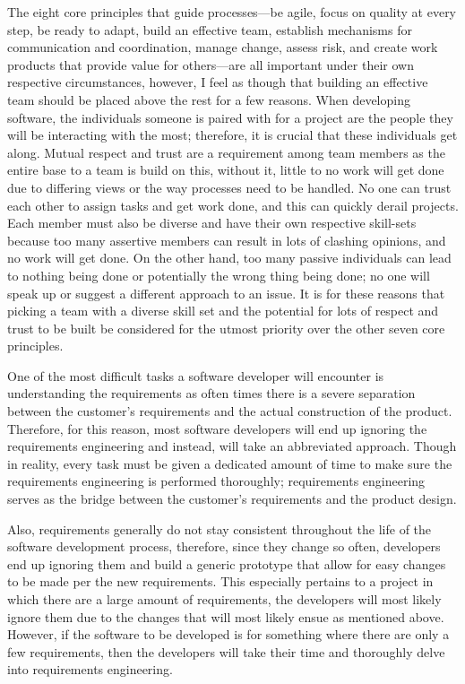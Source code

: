 	The eight core principles that guide processes—be agile, focus on quality at every step, be ready to adapt, build an effective team, establish mechanisms for communication and coordination, manage change, assess risk, and create work products that provide value for others—are all important under their own respective circumstances, however, I feel as though that building an effective team should be placed above the rest for a few reasons. When developing software, the individuals someone is paired with for a project are the people they will be interacting with the most; therefore, it is crucial that these individuals get along. Mutual respect and trust are a requirement among team members as the entire base to a team is build on this, without it, little to no work will get done due to differing views or the way processes need to be handled. No one can trust each other to assign tasks and get work done, and this can quickly derail projects. Each member must also be diverse and have their own respective skill-sets because too many assertive members can result in lots of clashing opinions, and no work will get done. On the other hand, too many passive individuals can lead to nothing being done or potentially the wrong thing being done; no one will speak up or suggest a different approach to an issue. It is for these reasons that picking a team with a diverse skill set and the potential for lots of respect and trust to be built be considered for the utmost priority over the other seven core principles.


	One of the most difficult tasks a software developer will encounter is understanding the requirements as often times there is a severe separation between the customer's requirements and the actual construction of the product. Therefore, for this reason, most software developers will end up ignoring the requirements engineering and instead, will take an abbreviated approach. Though in reality, every task must be given a dedicated amount of time to make sure the requirements engineering is performed thoroughly; requirements engineering serves as the bridge between the customer's requirements and the product design.

	Also, requirements generally do not stay consistent throughout the life of the software development process, therefore, since they change so often, developers end up ignoring them and build a generic prototype that allow for easy changes to be made per the new requirements. This especially pertains to a project in which there are a large amount of requirements, the developers will most likely ignore them due to the changes that will most likely ensue as mentioned above. However, if the software to be developed is for something where there are only a few requirements, then the developers will take their time and thoroughly delve into requirements engineering.

